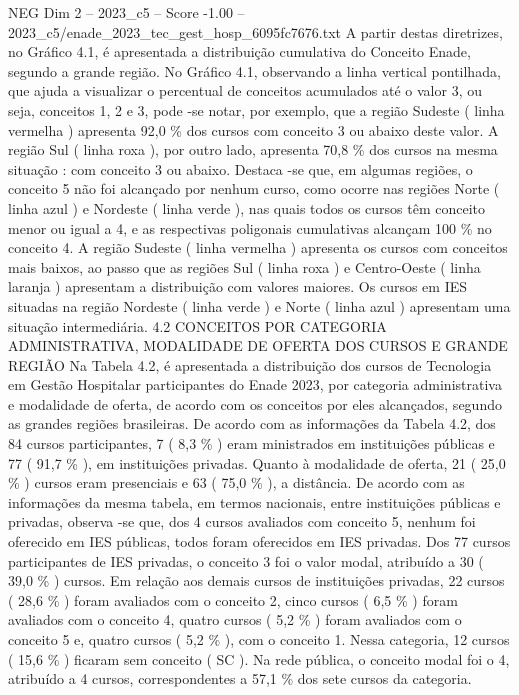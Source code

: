 \begin{textsample}{NEG Dim 2 – 2023\_c5 – Score -1.00 – 2023\_c5/enade\_2023\_tec\_gest\_hosp\_6095fc7676.txt}
A partir destas diretrizes, no Gráfico 4.1, é apresentada a distribuição cumulativa do Conceito Enade, segundo a grande região.
No Gráfico 4.1, observando a linha vertical pontilhada, que ajuda a visualizar o percentual de conceitos acumulados até o valor 3, ou seja, conceitos 1, 2 e 3, pode -se notar, por exemplo, que a região Sudeste ( linha vermelha ) apresenta 92,0 \% dos cursos com conceito 3 ou abaixo deste valor.
A região Sul ( linha roxa ), por outro lado, apresenta 70,8 \% dos cursos na mesma situação : com conceito 3 ou abaixo.
Destaca -se que, em algumas regiões, o conceito 5 não foi alcançado por nenhum curso, como ocorre nas regiões Norte ( linha azul ) e Nordeste ( linha verde ), nas quais todos os cursos têm conceito menor ou igual a 4, e as respectivas poligonais cumulativas alcançam 100 \% no conceito 4.
A região Sudeste ( linha vermelha ) apresenta os cursos com conceitos mais baixos, ao passo que as regiões Sul ( linha roxa ) e Centro-Oeste ( linha laranja ) apresentam a distribuição com valores maiores.
Os cursos em IES situadas na região Nordeste ( linha verde ) e Norte ( linha azul ) apresentam uma situação intermediária. 4.2 CONCEITOS POR CATEGORIA ADMINISTRATIVA, MODALIDADE DE OFERTA DOS CURSOS E GRANDE REGIÃO Na Tabela 4.2, é apresentada a distribuição dos cursos de Tecnologia em Gestão Hospitalar participantes do Enade 2023, por categoria administrativa e modalidade de oferta, de acordo com os conceitos por eles alcançados, segundo as grandes regiões brasileiras.
De acordo com as informações da Tabela 4.2, dos 84 cursos participantes, 7 ( 8,3 \% ) eram ministrados em instituições públicas e 77 ( 91,7 \% ), em instituições privadas.
Quanto à modalidade de oferta, 21 ( 25,0 \% ) cursos eram presenciais e 63 ( 75,0 \% ), a distância.
De acordo com as informações da mesma tabela, em termos nacionais, entre instituições públicas e privadas, observa -se que, dos 4 cursos avaliados com conceito 5, nenhum foi oferecido em IES públicas, todos foram oferecidos em IES privadas.
Dos 77 cursos participantes de IES privadas, o conceito 3 foi o valor modal, atribuído a 30 ( 39,0 \% ) cursos.
Em relação aos demais cursos de instituições privadas, 22 cursos ( 28,6 \% ) foram avaliados com o conceito 2, cinco cursos ( 6,5 \% ) foram avaliados com o conceito 4, quatro cursos ( 5,2 \% ) foram avaliados com o conceito 5 e, quatro cursos ( 5,2 \% ), com o conceito 1.
Nessa categoria, 12 cursos ( 15,6 \% ) ficaram sem conceito ( SC ).
Na rede pública, o conceito modal foi o 4, atribuído a 4 cursos, correspondentes a 57,1 \% dos sete cursos da categoria.

\end{textsample}
